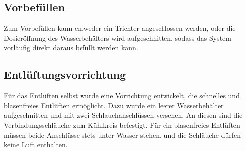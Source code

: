 \subsection{Vorbefüllen}
\label{subsec:vorbefuellen}

Zum Vorbefüllen kann entweder ein Trichter angeschlossen werden, oder die
Dosieröffnung des Wasserbehälters wird aufgeschnitten, sodass das System
vorläufig direkt daraus befüllt werden kann.

\subsection{Entlüftungsvorrichtung}
\label{subsec:entlueftungsvorrichtung}

Für das Entlüften selbst wurde eine Vorrichtung entwickelt, die schnelles und
blasenfreies Entlüften ermöglicht. Dazu wurde ein leerer Wasserbehälter
aufgeschnitten und mit zwei Schlauchanschlüssen versehen. An diesen sind die
Verbindungsschläuche zum Kühlkreis befestigt. Für ein blasenfreies Entlüften
müssen beide Anschlüsse stets unter Wasser stehen, und die Schläuche dürfen
keine Luft enthalten.


